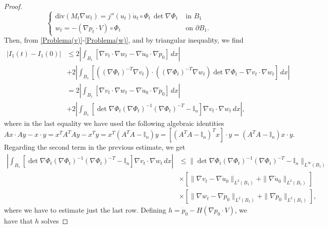 \documentclass[oneside,a4paper,11pt,notitlepage]{article}
\newcommand{\abs}[1]{{\left|#1\right|}}
\theoremstyle{definition}
\theoremstyle{plain}
\theoremstyle{definition}
\begin{document}
\begin{proof}
\begin{equation}
\begin{cases}
            \mathrm{div}(M_t\nabla w_t)=j''(u_t)\dot{u}_t\circ\Phi_t\,\det\nabla\Phi_t & \text{ in } B_1\\
            w_t=-(\nabla p_t\cdot V)\circ\Phi_t & \text{ on } \partial B_1.
        \end{cases}
    \end{equation}
    Then, from \eqref{Problema(v)}-\eqref{Problema(w)}, and by triangular inequality, we find
    \begin{equation*}
        \begin{split}
            |I_1(t)-I_1(0)|&\leq2\abs{\int_{B_1}[\nabla v_t\cdot\nabla w_t-\nabla\dot{u}_0\cdot\nabla\dot{p}_0]\,dx}\\
            &+2\abs{\int_{B_1}\left[\left((\nabla\Phi_t)^{-T}\nabla v_t \right)\cdot\left((\nabla\Phi_t)^{-T}\nabla w_t \right)\det\nabla\Phi_t-\nabla v_t\cdot\nabla w_t \right]\,dx}\\
            &=2\abs{\int_{B_1}[\nabla v_t\cdot\nabla w_t-\nabla\dot{u}_0\cdot\nabla\dot{p}_0]\,dx}\\
            &+2\abs{\int_{B_1}\left[\det\nabla\Phi_t(\nabla\Phi_t)^{-1}(\nabla\Phi_t)^{-T}-\mathbb{I}_n \right]\nabla v_t\cdot\nabla w_t\,dx},
        \end{split}
    \end{equation*}
    where in the last equality we have used the following algebraic identities
    \begin{equation*}
        Ax\cdot Ay-x\cdot y=x^TA^TAy-x^Ty=x^T(A^TA-\mathbb{I}_n)y=[(A^TA-\mathbb{I}_n)^Tx]\cdot y=(A^TA-\mathbb{I}_n)x\cdot y.
    \end{equation*}
    Regarding the second term in the previous estimate, we get
    \begin{equation*}
        \begin{split}
            \abs{\int_{B_1}\left[\det\nabla\Phi_t(\nabla\Phi_t)^{-1}(\nabla\Phi_t)^{-T}-\mathbb{I}_n \right]\nabla v_t\cdot\nabla w_t\,dx}&\leq\|\det\nabla\Phi_t(\nabla\Phi_t)^{-1}(\nabla\Phi_t)^{-T}-\mathbb{I}_n\|_{L^\infty(B_1)}\\
            &\times\left[\|\nabla v_t-\nabla\dot{u}_0\|_{L^2(B_1)}+\|\nabla \dot{u}_0\|_{L^2(B_1)} \right]\\
            &\times\left[\|\nabla w_t-\nabla\dot{p}_0\|_{L^2(B_1)}+\|\nabla \dot{p}_0\|_{L^2(B_1)} \right],
        \end{split}
    \end{equation*}
    where we have to estimate just the last row.
    Defining $h=\dot{p}_0-H(\nabla p_0\cdot V)$, we have that $h$ solves

\end{proof}
\end{document}

